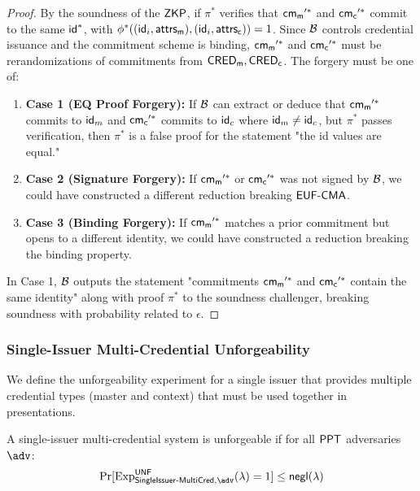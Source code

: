 \begin{proof}
By the soundness of the $\mathsf{ZKP}$, if $\pi^*$ verifies that $\mathsf{cm_m}'^*$ and $ \mathsf{cm_c}'^*$ commit to the same $\mathsf{id}^*$, with $\phi^*((\mathsf{id}_i, \mathsf{attrs_m}), (\mathsf{id}_i, \mathsf{attrs_c})) = 1$. Since $\mathcal{B}$ controls credential issuance and the commitment scheme is binding, $\mathsf{cm_m}'^*$ and $\mathsf{cm_c}'^*$ must be rerandomizations of commitments from $\mathsf{CRED_m}, \mathsf{CRED_c}$. The forgery must be one of:
\begin{enumerate}
    
    \item \textbf{Case 1 (EQ Proof Forgery):} If $\mathcal{B}$ can extract or deduce that $\mathsf{cm_m}'^*$ commits to $\mathsf{id}_m$ and $\mathsf{cm_c}'^*$ commits to $\mathsf{id}_c$ where $\mathsf{id}_m \neq \mathsf{id}_c$, but $\pi^*$ passes verification, then $\pi^*$ is a false proof for the statement "the id values are equal."
    
    \item \textbf{Case 2 (Signature Forgery):} If $\mathsf{cm_m}'^*$ or $\mathsf{cm_c}'^*$ was not signed by $\mathcal{B}$, we could have constructed a different reduction breaking $\mathsf{EUF\text{-}CMA}$.
    
    \item \textbf{Case 3 (Binding Forgery):} If $\mathsf{cm_m}'^*$ matches a prior commitment but opens to a different identity, we could have constructed a reduction breaking the binding property.
\end{enumerate}

In Case 1, $\mathcal{B}$ outputs the statement "commitments $\mathsf{cm_m}'^*$ and $\mathsf{cm_c}'^*$ contain the same identity" along with proof $\pi^*$ to the soundness challenger, breaking soundness with probability related to $\epsilon$.
\end{proof}







\subsubsection{Single-Issuer Multi-Credential Unforgeability}
We define the unforgeability experiment for a single issuer that provides multiple credential types (master and context) that must be used together in presentations.

\begin{definition}
A single-issuer multi-credential system is unforgeable if for all $\mathsf{PPT}$ adversaries $\adv$:
\[
\Pr[\mathrm{Exp}^{\mathsf{UNF}}_{\mathsf{SingleIssuer\text{-}MultiCred}, \adv}(\lambda) = 1] \leq \negl
\]
\end{definition}

